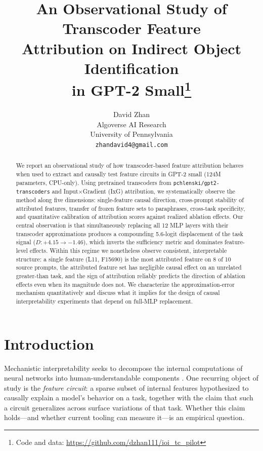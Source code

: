 \documentclass{article}
\title{An Observational Study of Transcoder Feature\\
Attribution on Indirect Object Identification\\
in GPT-2 Small\thanks{Code and data: \url{https://github.com/dzhan111/ioi_tc_pilot}}}
\author{%
  David Zhan \\
  Algoverse AI Research \\
  University of Pennsylvania \\
  \texttt{zhandavid4@gmail.com} \\
}
\begin{document}
\maketitle

\begin{abstract}
We report an observational study of how transcoder-based feature attribution
behaves when used to extract and causally test feature circuits in GPT-2 small
(124M parameters, CPU-only). Using pretrained transcoders from
\texttt{pchlenski/gpt2-transcoders} and Input$\times$Gradient (IxG)
attribution, we systematically observe the method along five dimensions:
single-feature causal direction, cross-prompt stability of attributed features,
transfer of frozen feature sets to paraphrases, cross-task specificity, and
quantitative calibration of attribution scores against realized ablation
effects. Our central observation is that simultaneously replacing all 12 MLP
layers with their transcoder approximations produces a compounding 5.6-logit
displacement of the task signal ($D: +4.15 \to -1.46$), which inverts the
sufficiency metric and dominates feature-level effects. Within this regime we
nonetheless observe consistent, interpretable structure: a single feature
(L11, F15690) is the most attributed feature on 8 of 10 source prompts, the
attributed feature set has negligible causal effect on an unrelated
greater-than task, and the sign of attribution reliably predicts the direction
of ablation effects even when its magnitude does not. We characterize the
approximation-error mechanism quantitatively and discuss what it implies for
the design of causal interpretability experiments that depend on full-MLP
replacement.
\end{abstract}

\section{Introduction}

Mechanistic interpretability seeks to decompose the internal computations of
neural networks into human-understandable components
\citep{olah2020zoom, elhage2021mathematical}. One recurring object of study is
the \emph{feature circuit}: a sparse subset of internal features hypothesized
to causally explain a model's behavior on a task, together with the claim that
such a circuit generalizes across surface variations of that task. Whether
this claim holds---and whether current tooling can measure it---is an empirical
question.
\end{document}
